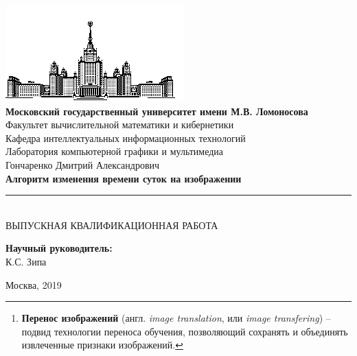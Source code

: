 \documentclass[11pt,a4paper]{extarticle}
\begin{document}
\begin{titlepage}
	\begin{centering}
		\includegraphics{img/msu}\\
		\large{
			\textbf{Московский государственный университет имени М.В. Ломоносова}\\
			Факультет вычислительной математики и кибернетики\\
			Кафедра интеллектуальных информационных технологий\\
			Лаборатория компьютерной графики и мультимедиа\\[4cm]
		}
		\Large{
			Гончаренко Дмитрий Александрович\\[0.9cm]
		}
		\Large{
			\textbf{Алгоритм изменения времени суток на изображении}\\
		}
		\rule[0.3cm]{14cm}{0.02cm}\\[1cm]
		\large{
			ВЫПУСКНАЯ КВАЛИФИКАЦИОННАЯ РАБОТА\\[4cm]
		}
	\end{centering}
	\begin{flushright}
		\large{
			\textbf{Научный руководитель:}\\ К.С. Зипа\\
		}
	\end{flushright}
	\begin{center}
		\vfill
		\large{
			Москва, 2019
		}
	\end{center}
\end{titlepage}

\begin{abstract}
	Алгоритм изменения времени суток на изображении относится к классу задач машинного обучения по \textit{переносу
	изображений}\footnote{
		\textbf{Перенос изображений} (англ. \textit{image translation}, или \textit{image transfering})
		-- подвид технологии переноса обучения, позволяющий сохранять и объединять извлеченные признаки изображений.
	}.
	Данная сфера значительное продвинулась благодаря современным вычислительным возможностям, в частности, переносе обучения на графические процессоры, GPU.
	За последние несколько лет появилось немало исследовательских работ на тему междоменных переносов изображений, стилей и колоризации.
	В данной работе рассматриваются современные подходы к переносу изображений, применимые к задаче изменения времени суток на изображении.
	Проводится описание нейросетевых моделей, обоснование и выбор метода и сравнительный анализ серии экспериментов обучения.
\end{abstract}
\end{document}
